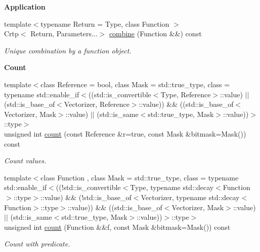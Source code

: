 \begin{Indent}{\bf Application}
\begin{DoxyCompactItemize}
{\footnotesize template$<$typename Return  = Type, class Function $>$ }\\Crtp$<$ Return, Parameters...$>$ \hyperlink{classmagrathea_1_1StaticVectorizer_af31f97a4d517c0b50f6b00ec569bbdb1}{combine} (Function \&\&) const 
\begin{DoxyCompactList}\small\item\em Unique combination by a function object. \end{DoxyCompactList}\end{DoxyCompactItemize}
\end{Indent}
\begin{Indent}{\bf Count}\par
\begin{DoxyCompactItemize}
\item 
{\footnotesize template$<$class Reference  = bool, class Mask  = std\-::true\-\_\-type, class  = typename std\-::enable\-\_\-if$<$((std\-::is\-\_\-convertible$<$\-Type, Reference$>$\-::value) $|$$|$ (std\-::is\-\_\-base\-\_\-of$<$\-Vectorizer, Reference$>$\-::value)) \&\& ((std\-::is\-\_\-base\-\_\-of$<$\-Vectorizer, Mask$>$\-::value) $|$$|$ (std\-::is\-\_\-same$<$std\-::true\-\_\-type, Mask$>$\-::value))$>$\-::type$>$ }\\unsigned int \hyperlink{classmagrathea_1_1StaticVectorizer_ad80642295ec9673ab0843eb453a9b972}{count} (const Reference \&r=true, const Mask \&bitmask=Mask()) const 
\begin{DoxyCompactList}\small\item\em Count values. \end{DoxyCompactList}\item 
{\footnotesize template$<$class Function , class Mask  = std\-::true\-\_\-type, class  = typename std\-::enable\-\_\-if$<$((!std\-::is\-\_\-convertible$<$\-Type, typename std\-::decay$<$\-Function$>$\-::type$>$\-::value) \&\& (!std\-::is\-\_\-base\-\_\-of$<$\-Vectorizer, typename std\-::decay$<$\-Function$>$\-::type$>$\-::value)) \&\& ((std\-::is\-\_\-base\-\_\-of$<$\-Vectorizer, Mask$>$\-::value) $|$$|$ (std\-::is\-\_\-same$<$std\-::true\-\_\-type, Mask$>$\-::value))$>$\-::type$>$ }\\unsigned int \hyperlink{classmagrathea_1_1StaticVectorizer_a17209e21d93cf648d3428c79da6827b6}{count} (Function \&\&f, const Mask \&bitmask=Mask()) const 
\begin{DoxyCompactList}\small\item\em Count with predicate. \end{DoxyCompactList}\item 

\end{DoxyCompactItemize}
\end{Indent}
